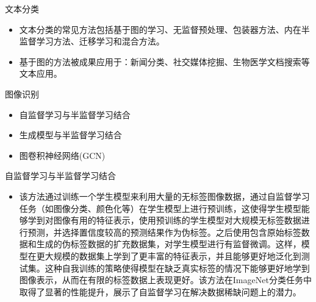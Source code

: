 \documentclass[UTF8]{beamer}
\begin{document}
\begin{frame}{文本分类}
    \begin{itemize}
        \item 文本分类的常见方法包括基于图的学习、无监督预处理、包装器方法、内在半监督学习方法、迁移学习和混合方法。
        \item 基于图的方法被成果应用于：新闻分类、社交媒体挖掘、生物医学文档搜索等文本应用。
    \end{itemize}
\end{frame}

\begin{frame}{图像识别}
    \begin{itemize}
        \item 自监督学习与半监督学习结合
        \item 生成模型与半监督学习结合
        \item 图卷积神经网络(GCN)
    \end{itemize}
\end{frame}

\begin{frame}{自监督学习与半监督学习结合}
    \begin{itemize}
        \item 该方法通过训练一个学生模型来利用大量的无标签图像数据，通过自监督学习任务（如图像分类、颜色化等）在学生模型上进行预训练，这使得学生模型能够学到对图像有用的特征表示，使用预训练的学生模型对大规模无标签数据进行预测，并选择置信度较高的预测结果作为伪标签。之后使用包含原始标签数据和生成的伪标签数据的扩充数据集，对学生模型进行有监督微调。这样，模型在更大规模的数据集上学到了更丰富的特征表示，并且能够更好地泛化到测试集。这种自我训练的策略使得模型在缺乏真实标签的情况下能够更好地学到图像表示，从而在有限的标签数据上表现更好。该方法在ImageNet分类任务中取得了显著的性能提升，展示了自监督学习在解决数据稀缺问题上的潜力。
    \end{itemize}
\end{frame}
\end{document}
